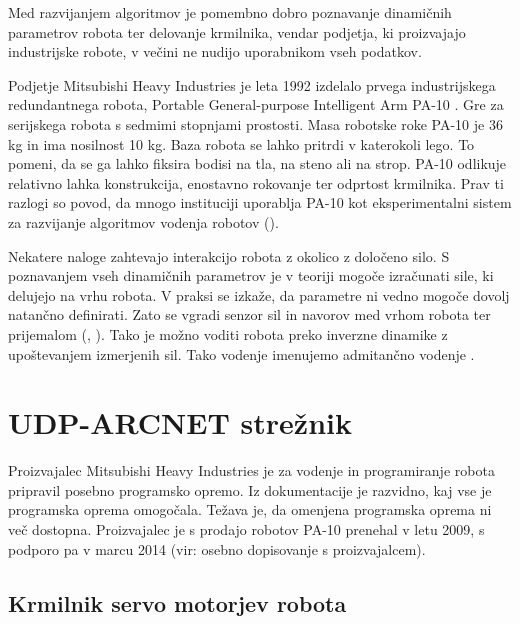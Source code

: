 \documentclass[a4paper]{article}
\begin{document}
Med razvijanjem algoritmov je pomembno dobro poznavanje dinamičnih parametrov robota ter delovanje krmilnika, vendar podjetja, ki proizvajajo industrijske robote, v večini ne nudijo uporabnikom vseh podatkov.

Podjetje Mitsubishi Heavy Industries je leta 1992 izdelalo prvega industrijskega redundantnega robota, Portable General-purpose Intelligent Arm PA-10 \cite{mhi_pa10}. Gre za serijskega robota s sedmimi stopnjami prostosti. Masa robotske roke PA-10 je 36 kg in ima nosilnost 10 kg. Baza robota se lahko pritrdi v katerokoli lego. To pomeni, da se ga lahko fiksira bodisi na tla, na steno ali na strop. PA-10 odlikuje relativno lahka konstrukcija, enostavno rokovanje ter odprtost krmilnika. Prav ti razlogi so povod, da mnogo instituciji uporablja PA-10 kot eksperimentalni sistem za razvijanje algoritmov vodenja robotov (\cite{voung_pa10,aalst_pa10,rodrigo_pa10,petric_nevronska}).

Nekatere naloge zahtevajo interakcijo robota z okolico z določeno silo. S poznavanjem vseh dinamičnih parametrov je v teoriji mogoče izračunati sile, ki delujejo na vrhu robota. V praksi se izkaže, da parametre ni vedno mogoče dovolj natančno definirati. Zato se vgradi senzor sil in navorov med vrhom robota ter prijemalom (\cite{almassri_pressure_sensor,mihelj_vodenje}, \cite{eppinger_force_dynamics}). Tako je možno voditi robota preko inverzne dinamike z upoštevanjem izmerjenih sil. Tako vodenje imenujemo admitančno vodenje \cite{mihelj_hapt}.

	
\section{UDP-ARCNET strežnik}

Proizvajalec Mitsubishi Heavy Industries je za vodenje in programiranje robota pripravil posebno programsko opremo. Iz dokumentacije je razvidno, kaj vse je programska oprema omogočala. Težava je, da omenjena programska oprema ni več dostopna. Proizvajalec je s prodajo robotov PA-10 prenehal v letu 2009, s podporo pa v marcu 2014 (vir: osebno dopisovanje s proizvajalcem). 

\subsection{Krmilnik servo motorjev robota} \label{sec:servo-drive}
\end{document}

